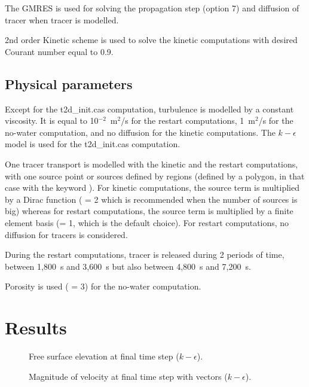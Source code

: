 The GMRES is used for solving the propagation step (option 7) and diffusion
of tracer when tracer is modelled.


2nd order Kinetic scheme is used to solve the kinetic computations
with desired Courant number equal to 0.9.

\subsection{Physical parameters}

Except for the t2d\_init.cas computation, turbulence is modelled by a constant
viscosity.
It is equal to 10$^{-2}$~m$^2$/s for the restart computations, 1~m$^2$/s for
the no-water computation, and no diffusion for the kinetic computations.
The $k-\epsilon$ model is used for the t2d\_init.cas computation.

One tracer transport is modelled with the kinetic and the restart computations,
with one source point or sources defined by regions (defined by a polygon,
in that case with the keyword ).
For kinetic computations, the source term is multiplied by a Dirac function
( = 2 which is recommended when the number of sources is
big) whereas for restart computations, the source term is multiplied by a finite
element basis (= 1, which is the default choice).
For restart computations, no diffusion for tracers is considered.

During the restart computations, tracer is released during 2 periods of time,
between 1,800~s and 3,600~s but also between 4,800~s and 7,200~s.

Porosity is used ( = 3) for
the no-water computation.

\section{Results}

\begin{figure}[H]
\centering
{}
\caption{Free surface elevation at final time step ($k-\epsilon$).}
\label{t2d:init:freesurfseq}
\end{figure}

\begin{figure}[H]
\centering
{}
\caption{Magnitude of velocity at final time step with vectors ($k-\epsilon$).}
\label{t2d:init:velovectseq}
\end{figure}

